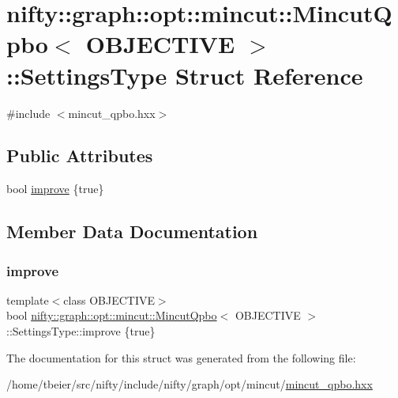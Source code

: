 \hypertarget{structnifty_1_1graph_1_1opt_1_1mincut_1_1MincutQpbo_1_1SettingsType}{}\section{nifty\+:\+:graph\+:\+:opt\+:\+:mincut\+:\+:Mincut\+Qpbo$<$ O\+B\+J\+E\+C\+T\+I\+VE $>$\+:\+:Settings\+Type Struct Reference}
\label{structnifty_1_1graph_1_1opt_1_1mincut_1_1MincutQpbo_1_1SettingsType}


{\ttfamily \#include $<$mincut\+\_\+qpbo.\+hxx$>$}

\subsection*{Public Attributes}
\begin{DoxyCompactItemize}
\item 
bool \hyperlink{structnifty_1_1graph_1_1opt_1_1mincut_1_1MincutQpbo_1_1SettingsType_ab58b938dd1666e7c70d87e24f829be59}{improve} \{true\}
\end{DoxyCompactItemize}


\subsection{Member Data Documentation}
\mbox{\label{structnifty_1_1graph_1_1opt_1_1mincut_1_1MincutQpbo_1_1SettingsType_ab58b938dd1666e7c70d87e24f829be59}} 
\subsubsection{\texorpdfstring{improve}{improve}}
{\footnotesize\ttfamily template$<$class O\+B\+J\+E\+C\+T\+I\+VE$>$ \\
bool \hyperlink{classnifty_1_1graph_1_1opt_1_1mincut_1_1MincutQpbo}{nifty\+::graph\+::opt\+::mincut\+::\+Mincut\+Qpbo}$<$ O\+B\+J\+E\+C\+T\+I\+VE $>$\+::Settings\+Type\+::improve \{true\}}



The documentation for this struct was generated from the following file\+:\begin{DoxyCompactItemize}
\item 
/home/tbeier/src/nifty/include/nifty/graph/opt/mincut/\hyperlink{mincut__qpbo_8hxx}{mincut\+\_\+qpbo.\+hxx}\end{DoxyCompactItemize}
